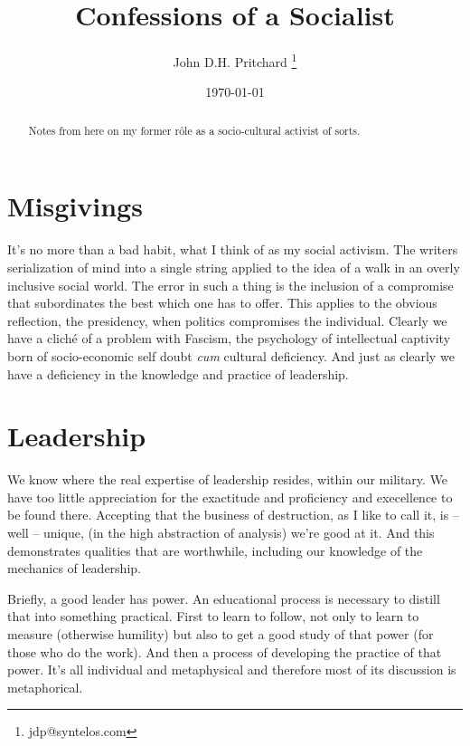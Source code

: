 \documentclass[twocolumn,12pt]{article}
\begin{document}
\title{Confessions of a Socialist}

\author{John D.H. Pritchard \thanks{jdp@syntelos.com}}

\date{\today}

\maketitle


\begin{abstract}

Notes from here on my former r\^ole as a socio-cultural activist of
sorts.

\end{abstract}


\section{Misgivings}

It's no more than a bad habit, what I think of as my social activism.
The writers serialization of mind into a single string applied to the
idea of a walk in an overly inclusive social world.  The error in such
a thing is the inclusion of a compromise that subordinates the best
which one has to offer.  This applies to the obvious reflection, the
presidency, when politics compromises the individual.  Clearly we have
a clich\'e of a problem with Fascism, the psychology of intellectual
captivity born of socio-economic self doubt {\it cum} cultural
deficiency.  And just as clearly we have a deficiency in the knowledge
and practice of leadership.

\section{Leadership}

We know where the real expertise of leadership resides, within our
military.  We have too little appreciation for the exactitude and
proficiency and execellence to be found there.  Accepting that the
business of destruction, as I like to call it, is -- well -- unique,
(in the high abstraction of analysis) we're good at it.  And this
demonstrates qualities that are worthwhile, including our knowledge of
the mechanics of leadership.

Briefly, a good leader has power.  An educational process is necessary
to distill that into something practical.  First to learn to follow,
not only to learn to measure (otherwise humility) but also to get a
good study of that power (for those who do the work).  And then a
process of developing the practice of that power.  It's all individual
and metaphysical and therefore most of its discussion is metaphorical.
\end{document}
